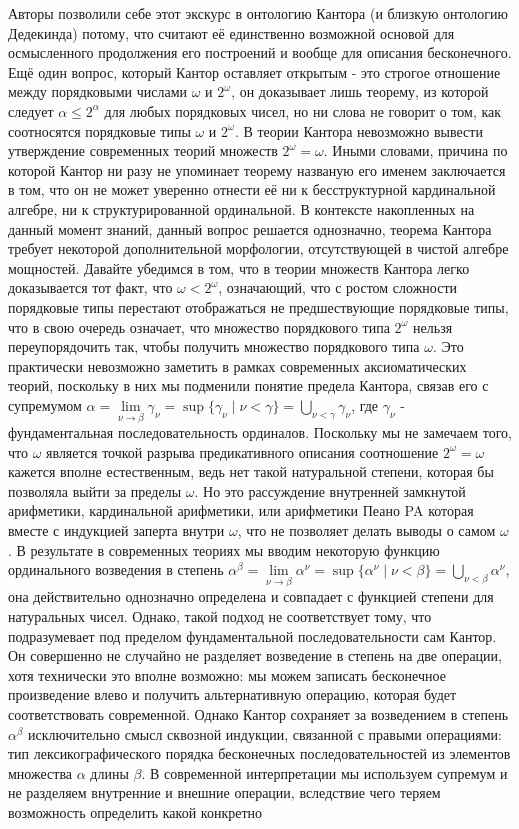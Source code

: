 \documentclass[12pt]{article}
\begin{document}
Авторы позволили себе этот экскурс в онтологию Кантора (и близкую онтологию Дедекинда) потому, что считают её единственно возможной основой для осмысленного продолжения его построений и вообще для описания бесконечного. Ещё один вопрос, который Кантор оставляет открытым - это строгое отношение между порядковыми числами $\omega$ и $2^{\omega}$, он доказывает лишь теорему, из которой следует $\alpha \leq 2^{\alpha}$ для любых порядковых чисел, но ни слова не говорит о том, как соотносятся порядковые типы $\omega$ и $2^{\omega}$. В теории Кантора невозможно вывести утверждение современных теорий множеств $2^{\omega} = \omega$. Иными словами, причина по которой Кантор ни разу не упоминает теорему названую его именем заключается в том, что он не может уверенно отнести её ни к бесструктурной кардинальной алгебре, ни к структурированной ординальной. В контексте накопленных на данный момент знаний, данный вопрос решается однозначно, теорема Кантора требует некоторой дополнительной морфологии, отсутствующей в чистой алгебре мощностей. Давайте убедимся в том, что в теории множеств Кантора легко доказывается тот факт, что $\omega < 2^{\omega}$, означающий, что с ростом сложности порядковые типы перестают отображаться не предшествующие порядковые типы, что в свою очередь означает, что множество порядкового типа $2^{\omega}$ нельзя переупорядочить так, чтобы получить множество порядкового типа $\omega$. Это практически невозможно заметить в рамках современных аксиоматических теорий, поскольку в них мы подменили понятие предела Кантора, связав его с супремумом $\alpha = \lim\limits_{\nu \to \beta} \gamma_{\nu} = \sup \{ \gamma_{\nu} \mid \nu < \gamma \} = \bigcup\limits_{\nu < \gamma} \gamma_{\nu}$, где $\gamma_{\nu}$ - фундаментальная последовательность ординалов. Поскольку мы не замечаем того, что $\omega$ является точкой разрыва предикативного описания соотношение $2^{\omega} = \omega$ кажется вполне естественным, ведь нет такой натуральной степени, которая бы позволяла выйти за пределы $\omega$. Но это рассуждение внутренней замкнутой арифметики, кардинальной арифметики, или арифметики Пеано PA которая вместе с индукцией заперта внутри $\omega$, что не позволяет делать выводы о самом $\omega$. В результате в современных теориях мы вводим некоторую функцию ординального возведения в степень $\alpha^{\beta} = \lim\limits_{\nu \to \beta} \alpha^{\nu} = \sup \{ \alpha^{\nu} \mid \nu < \beta \} = \bigcup\limits_{\nu < \beta} \alpha^{\nu}$, она действительно однозначно определена и совпадает с функцией степени для натуральных чисел. Однако, такой подход не соответствует тому, что подразумевает под пределом фундаментальной последовательности сам Кантор. Он совершенно не случайно не разделяет возведение в степень на две операции, хотя технически это вполне возможно: мы можем записать бесконечное произведение влево и получить альтернативную операцию, которая будет соответствовать современной. Однако Кантор сохраняет за возведением в степень $\alpha^{\beta}$ исключительно смысл сквозной индукции, связанной с правыми операциями: тип лексикографического порядка бесконечных последовательностей из элементов множества $\alpha$ длины $\beta$. В современной интерпретации мы используем супремум и не разделяем внутренние и внешние операции, вследствие чего теряем возможность определить какой конкретно 
\end{document}
